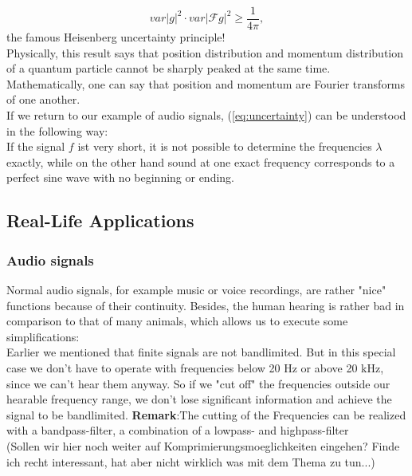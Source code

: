 \documentclass[a4paper, 11pt]{scrreprt}
\newcommand{\FF}{\mathcal{F}}
\begin{document}
	\[var|g|^2 \cdot var|\FF g|^2 \geq \frac{1}{4\pi},\]
the famous Heisenberg uncertainty principle!\\	
Physically, this result says that position distribution and momentum distribution of a quantum particle cannot be sharply peaked at the same time. Mathematically, one can say that position and momentum are Fourier transforms of one another.\\
If we return to our example of audio signals, (\ref{eq:uncertainty}) can be understood in the following way:\\
If the signal \(f\) ist very short, it is not possible to determine the frequencies \(\lambda\) exactly, while on the other hand sound at one exact frequency corresponds to a perfect sine wave with no beginning or ending.

\subsection{Real-Life Applications}
\label{se:real-life}

\subsubsection{Audio signals}
Normal audio signals, for example music or voice recordings, are rather "nice" functions because of their continuity. Besides, the human hearing is rather bad in comparison to that of many animals, which allows us to execute some simplifications:\\
Earlier we mentioned that finite signals are not bandlimited. But in this special case we don't have to operate with frequencies below 20 Hz or above 20 kHz, since we can't hear them anyway. So if we "cut off" the frequencies outside our hearable frequency range, we don't lose significant information and achieve the signal to be bandlimited. 
\textbf{Remark}:The cutting of the Frequencies can be realized with a bandpass-filter, a combination of a lowpass- and highpass-filter\\
(Sollen wir hier noch weiter auf Komprimierungsmoeglichkeiten eingehen? Finde ich recht interessant, hat aber nicht wirklich was mit dem Thema zu tun...)


\nocite{marks02}
\nocite{fornasier03}



\end{document}
